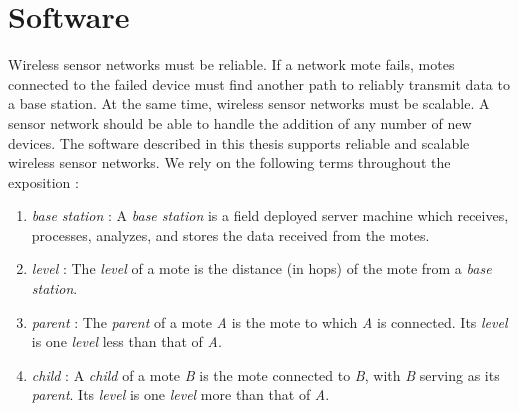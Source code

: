 \chapter{Software}

Wireless sensor networks must be reliable. If a network mote fails, motes connected to the failed device must find another path to reliably transmit data to a base station. At the same time, wireless sensor networks must be scalable. A sensor network should be able to handle the addition of any number of new devices. The software described in this thesis supports reliable and scalable wireless sensor networks. We rely on the following terms throughout the exposition :
\begin{enumerate}
\item \textit{base station} : A \textit{base station} is a field deployed server machine which receives, processes, analyzes, and stores the data received from the motes.
\item \textit{level} : The \textit{level} of a mote is the distance (in hops) of the mote from a \textit{base station}.
\item \textit{parent} : The \textit{parent} of a mote \textit{A} is the mote to which \textit{A} is connected. Its \textit{level} is one \textit{level} less than that of \textit{A}.
\item \textit{child} : A \textit{child} of a mote \textit{B} is the mote connected to \textit{B}, with \textit{B} serving as its \textit{parent}. Its \textit{level} is one \textit{level} more than that of \textit{A}.
\end{enumerate}

